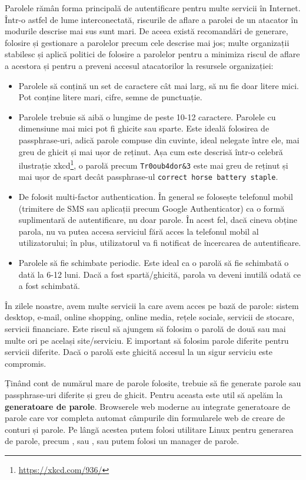 Parolele rămân forma principală de autentificare pentru multe servicii în Internet. Într-o astfel de lume interconectată, riscurile de aflare a parolei de un atacator în modurile descrise mai sus sunt mari. De aceea există recomandări de generare, folosire și gestionare a parolelor precum cele descrise mai jos; multe organizații stabilesc și aplică politici de folosire a parolelor pentru a minimiza riscul de aflare a acestora și pentru a preveni accesul atacatorilor la resursele organizației:

\begin{itemize}
  \item Parolele să conțină un set de caractere cât mai larg, să nu fie doar litere mici. Pot conține litere mari, cifre, semne de punctuație.
  \item Parolele trebuie să aibă o lungime de peste 10-12 caractere. Parolele cu dimensiune mai mici pot fi ghicite sau sparte. Este ideală folosirea de passphrase-uri, adică parole compuse din cuvinte, ideal nelegate între ele, mai greu de ghicit și mai ușor de reținut. Așa cum este descrisă într-o celebră ilustrație xkcd\footnote{\url{https://xkcd.com/936/}}, o parolă precum \texttt{Tr0oub4dor\&3} este mai greu de reținut și mai ușor de spart decât passphrase-ul \texttt{correct horse battery staple}.
  \item De folosit multi-factor authentication. În general se folosește telefonul mobil (trimitere de SMS sau aplicații precum Google Authenticator) ca o formă suplimentară de autentificare, nu doar parole. În acest fel, dacă cineva obține parola, nu va putea accesa serviciul fără acces la telefonul mobil al utilizatorului; în plus, utilizatorul va fi notificat de încercarea de autentificare.
  \item Parolele să fie schimbate periodic. Este ideal ca o parolă să fie schimbată o dată la 6-12 luni. Dacă a fost spartă/ghicită, parola va deveni inutilă odată ce a fost schimbată.
\end{itemize}

În zilele noastre, avem multe servicii la care avem acces pe bază de parole: sistem desktop, e-mail, online shopping, online media, rețele sociale, servicii de stocare, servicii financiare. Este riscul să ajungem să folosim o parolă de două sau mai multe ori pe același site/serviciu. E important să folosim parole diferite pentru servicii diferite. Dacă o parolă este ghicită accesul la un sigur serviciu este compromis.

Ținând cont de numărul mare de parole folosite, trebuie să fie generate parole sau passphrase-uri diferite și greu de ghicit. Pentru aceasta este util să apelăm la \textbf{generatoare de parole}. Browserele web moderne au integrate generatoare de parole care vor completa automat câmpurile din formularele web de creare de conturi și parole. Pe lângă acestea putem folosi utilitare Linux pentru generarea de parole, precum ,  sau , sau putem folosi un manager de parole.

